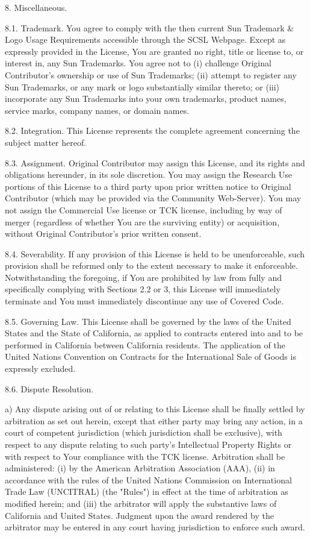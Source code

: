 {8.  Miscellaneous.

8.1.  Trademark.  You agree to comply with the then current Sun
Trademark \& Logo Usage Requirements accessible through the SCSL
Webpage.  Except as expressly provided in the License, You are granted
no right, title or license to, or interest in, any Sun Trademarks.
You agree not to (i) challenge Original Contributor's ownership or use
of Sun Trademarks; (ii) attempt to register any Sun Trademarks, or any
mark or logo substantially similar thereto; or (iii) incorporate any
Sun Trademarks into your own trademarks, product names, service marks,
company names, or domain names.

8.2.  Integration.  This License represents the complete agreement
concerning the subject matter hereof.

8.3.  Assignment.  Original Contributor may assign this License, and
its rights and obligations hereunder, in its sole discretion.  You may
assign the Research Use portions of this License to a third party upon
prior written notice to Original Contributor (which may be provided
via the Community Web-Server).  You may not assign the Commercial Use
license or TCK license, including by way of merger (regardless of
whether You are the surviving entity) or acquisition, without Original
Contributor's prior written consent.

8.4.  Severability.  If any provision of this License is held to be unenforceable, such provision shall be reformed only to the extent necessary to make it enforceable. Notwithstanding the foregoing, if You are prohibited by law from fully and specifically complying with Sections 2.2 or 3, this License will immediately terminate and You must immediately discontinue any use of Covered Code.

8.5.  Governing Law.  This License shall be governed by the laws of
the United States and the State of California, as applied to contracts
entered into and to be performed in California between California
residents.  The application of the United Nations Convention on
Contracts for the International Sale of Goods is expressly excluded.

8.6.  Dispute Resolution.

a) Any dispute arising out of or relating to this License shall be
finally settled by arbitration as set out herein, except that either
party may bring any action, in a court of competent jurisdiction
(which jurisdiction shall be exclusive), with respect to any dispute
relating to such party's Intellectual Property Rights or with respect
to Your compliance with the TCK license.  Arbitration shall be
administered: (i) by the American Arbitration Association (AAA), (ii)
in accordance with the rules of the United Nations Commission on
International Trade Law (UNCITRAL) (the "Rules") in effect at the time
of arbitration as modified herein; and (iii) the arbitrator will apply
the substantive laws of California and United States.  Judgment upon
the award rendered by the arbitrator may be entered in any court
having jurisdiction to enforce such award.

}
